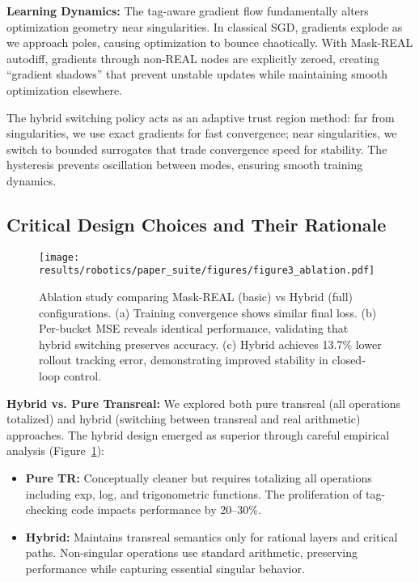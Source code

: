 \documentclass[twoside,11pt]{article}
\begin{document}
\textbf{Learning Dynamics:} The tag-aware gradient flow fundamentally alters optimization geometry near singularities. In classical SGD, gradients explode as we approach poles, causing optimization to bounce chaotically. With Mask-REAL autodiff, gradients through non-REAL nodes are explicitly zeroed, creating ``gradient shadows'' that prevent unstable updates while maintaining smooth optimization elsewhere.

The hybrid switching policy acts as an adaptive trust region method: far from singularities, we use exact gradients for fast convergence; near singularities, we switch to bounded surrogates that trade convergence speed for stability. The hysteresis prevents oscillation between modes, ensuring smooth training dynamics.
\subsection{Critical Design Choices and Their Rationale}

\begin{figure}[t]
\centering
\texttt{[image: results/robotics/paper\_suite/figures/figure3\_ablation.pdf]}
\caption{Ablation study comparing Mask-REAL (basic) vs Hybrid (full) configurations. (a) Training convergence shows similar final loss. (b) Per-bucket MSE reveals identical performance, validating that hybrid switching preserves accuracy. (c) Hybrid achieves 13.7\% lower rollout tracking error, demonstrating improved stability in closed-loop control.}
\label{fig:ablation}
\end{figure}

\textbf{Hybrid vs. Pure Transreal:} We explored both pure transreal (all operations totalized) and hybrid (switching between transreal and real arithmetic) approaches. The hybrid design emerged as superior through careful empirical analysis (Figure~\ref{fig:ablation}):

\begin{itemize}
\item \textbf{Pure TR:} Conceptually cleaner but requires totalizing all operations including exp, log, and trigonometric functions. The proliferation of tag-checking code impacts performance by 20--30\%.
\item \textbf{Hybrid:} Maintains transreal semantics only for rational layers and critical paths. Non-singular operations use standard arithmetic, preserving performance while capturing essential singular behavior.
\end{itemize}
\end{document}

